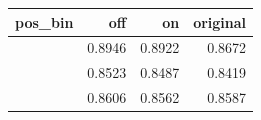 \begin{table}
\label{tab:task3_alignment_by_position}
\begin{tabular}{lrrr}
\toprule
pos\_bin & off & on & original \\
\midrule
[1,16] & 0.8946 & 0.8922 & 0.8672 \\
[17,32] & 0.8523 & 0.8487 & 0.8419 \\
[33,64] & 0.8606 & 0.8562 & 0.8587 \\
\bottomrule
\end{tabular}
\end{table}
